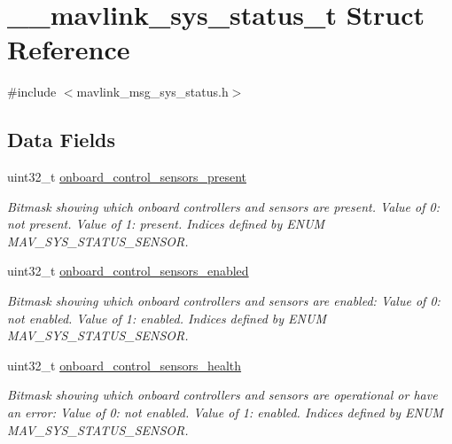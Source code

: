 \hypertarget{struct____mavlink__sys__status__t}{\section{\+\_\+\+\_\+mavlink\+\_\+sys\+\_\+status\+\_\+t Struct Reference}
\label{struct____mavlink__sys__status__t}
}


{\ttfamily \#include $<$mavlink\+\_\+msg\+\_\+sys\+\_\+status.\+h$>$}

\subsection*{Data Fields}
\begin{DoxyCompactItemize}
\item 
uint32\+\_\+t \hyperlink{struct____mavlink__sys__status__t_a9c506f0a78266af5a1230eb1a0ca78b9}{onboard\+\_\+control\+\_\+sensors\+\_\+present}
\begin{DoxyCompactList}\small\item\em Bitmask showing which onboard controllers and sensors are present. Value of 0\+: not present. Value of 1\+: present. Indices defined by E\+N\+U\+M M\+A\+V\+\_\+\+S\+Y\+S\+\_\+\+S\+T\+A\+T\+U\+S\+\_\+\+S\+E\+N\+S\+O\+R. \end{DoxyCompactList}\item 
uint32\+\_\+t \hyperlink{struct____mavlink__sys__status__t_ac7217643b5de2bd8fe861b0c9ff7277c}{onboard\+\_\+control\+\_\+sensors\+\_\+enabled}
\begin{DoxyCompactList}\small\item\em Bitmask showing which onboard controllers and sensors are enabled\+: Value of 0\+: not enabled. Value of 1\+: enabled. Indices defined by E\+N\+U\+M M\+A\+V\+\_\+\+S\+Y\+S\+\_\+\+S\+T\+A\+T\+U\+S\+\_\+\+S\+E\+N\+S\+O\+R. \end{DoxyCompactList}\item 
uint32\+\_\+t \hyperlink{struct____mavlink__sys__status__t_a8527d9f9e9517ee5a9dc7aba0235ace9}{onboard\+\_\+control\+\_\+sensors\+\_\+health}
\begin{DoxyCompactList}\small\item\em Bitmask showing which onboard controllers and sensors are operational or have an error\+: Value of 0\+: not enabled. Value of 1\+: enabled. Indices defined by E\+N\+U\+M M\+A\+V\+\_\+\+S\+Y\+S\+\_\+\+S\+T\+A\+T\+U\+S\+\_\+\+S\+E\+N\+S\+O\+R. \end{DoxyCompactList}\item 

\end{DoxyCompactItemize}
